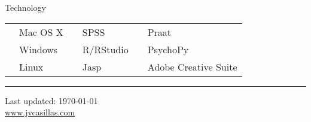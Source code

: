 \documentclass[11pt,letterpaper]{assets/tex/moderncv}
\begin{document}
\vspace{.2in}

Technology \vspace{-.18in}

\begin{tabular}{p{1.15in}lp{.7in}lp{.7in}l}
   & Mac OS X             & & SPSS      & & Praat                \\ 
   & Windows              & & R/RStudio & & PsychoPy             \\ 
   & Linux                & & Jasp      & & Adobe Creative Suite \\ [2.5ex]
\end{tabular}

\noindent 

\rule{492pt}{1.5pt}

\smallskip

\begin{center}
  \begin{footnotesize}
    Last updated: \today \\
    \href{http://www.jvcasillas.com}{www.jvcasillas.com}
  \end{footnotesize}
\end{center}


\end{document}
